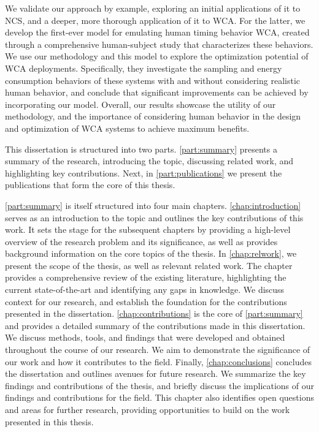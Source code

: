 We validate our approach by example, exploring an initial applications of it to \gls{NCS}, and a deeper, more thorough application of it to \gls{WCA}.
For the latter, we develop the first-ever model for emulating human timing behavior \gls{WCA}, created through a comprehensive human-subject study that characterizes these behaviors.
We use our methodology and this model to explore the optimization potential of \gls{WCA} deployments.
Specifically, they investigate the sampling and energy consumption behaviors of these systems with and without considering realistic human behavior, and conclude that significant improvements can be achieved by incorporating our model.
Overall, our results showcase the utility of our methodology, and the importance of considering human behavior in the design and optimization of \gls{WCA} systems to achieve maximum benefits.

\bigskip

This dissertation is structured into two parts.
\cref{part:summary} presents a summary of the research, introducing the topic, discussing related work, and highlighting key contributions.
Next, in \cref{part:publications} we present the publications that form the core of this thesis.

\cref{part:summary} is itself structured into four main chapters.
\cref{chap:introduction} serves as an introduction to the topic and outlines the key contributions of this work.
It sets the stage for the subsequent chapters by providing a high-level overview of the research problem and its significance, as well as provides background information on the core topics of the thesis.
In \cref{chap:relwork}, we present the scope of the thesis, as well as relevant related work.
The chapter provides a comprehensive review of the existing literature, highlighting the current state-of-the-art and identifying any gaps in knowledge.
We discuss context for our research, and establish the foundation for the contributions presented in the dissertation.
\cref{chap:contributions} is the core of \cref{part:summary} and provides a detailed summary of the contributions made in this dissertation.
We discuss methods, tools, and findings that were developed and obtained throughout the course of our research.
We aim to demonstrate the significance of our work and how it contributes to the field.
Finally, \cref{chap:conclusions} concludes the dissertation and outlines avenues for future research.
We summarize the key findings and contributions of the thesis, and briefly discuss the implications of our findings and contributions for the field.
This chapter also identifies open questions and areas for further research, providing opportunities to build on the work presented in this thesis.
